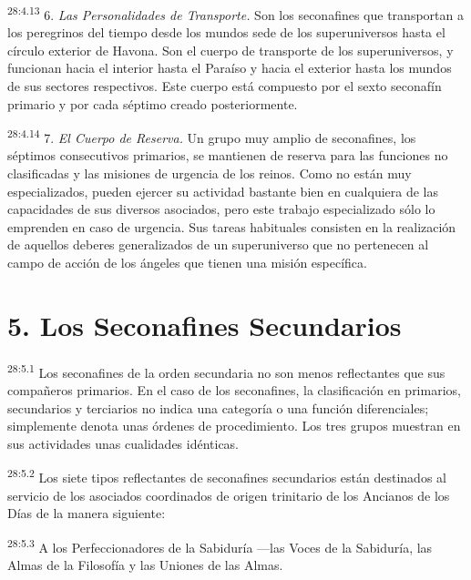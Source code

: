\par
\textsuperscript{28:4.13} 6. \textit{Las Personalidades de Transporte.} Son los seconafines que transportan a los peregrinos del tiempo desde los mundos sede de los superuniversos hasta el círculo exterior de Havona. Son el cuerpo de transporte de los superuniversos, y funcionan hacia el interior hasta el Paraíso y hacia el exterior hasta los mundos de sus sectores respectivos. Este cuerpo está compuesto por el sexto seconafín primario y por cada séptimo creado posteriormente.

\par
\textsuperscript{28:4.14} 7. \textit{El Cuerpo de Reserva.} Un grupo muy amplio de seconafines, los séptimos consecutivos primarios, se mantienen de reserva para las funciones no clasificadas y las misiones de urgencia de los reinos. Como no están muy especializados, pueden ejercer su actividad bastante bien en cualquiera de las capacidades de sus diversos asociados, pero este trabajo especializado sólo lo emprenden en caso de urgencia. Sus tareas habituales consisten en la realización de aquellos deberes generalizados de un superuniverso que no pertenecen al campo de acción de los ángeles que tienen una misión específica.

\section*{5. Los Seconafines Secundarios}
\par
\textsuperscript{28:5.1} Los seconafines de la orden secundaria no son menos reflectantes que sus compañeros primarios. En el caso de los seconafines, la clasificación en primarios, secundarios y terciarios no indica una categoría o una función diferenciales; simplemente denota unas órdenes de procedimiento. Los tres grupos muestran en sus actividades unas cualidades idénticas.

\par
\textsuperscript{28:5.2} Los siete tipos reflectantes de seconafines secundarios están destinados al servicio de los asociados coordinados de origen trinitario de los Ancianos de los Días de la manera siguiente:

\par
\textsuperscript{28:5.3} A los Perfeccionadores de la Sabiduría ---las Voces de la Sabiduría, las Almas de la Filosofía y las Uniones de las Almas.

